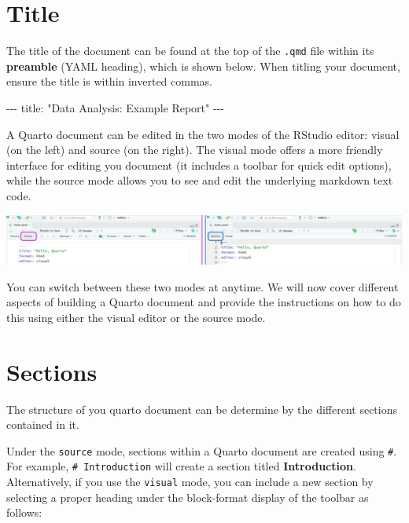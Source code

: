 \documentclass[
  letterpaper,
  DIV=11,
  numbers=noendperiod]{scrartcl}
\newenvironment{Shaded}{\begin{snugshade}}{\end{snugshade}}
\newcommand{\NormalTok}[1]{\textcolor[rgb]{0.00,0.23,0.31}{#1}}
\newcommand{\SpecialCharTok}[1]{\textcolor[rgb]{0.37,0.37,0.37}{#1}}
\newcommand{\StringTok}[1]{\textcolor[rgb]{0.13,0.47,0.30}{#1}}
\begin{document}
\section{Title}\label{sec-title}

The title of the document can be found at the top of the \texttt{.qmd}
file within its \textbf{preamble} (YAML heading), which is shown below.
When titling your document, ensure the title is within inverted commas.

\begin{Shaded}
\begin{Highlighting}[]
\SpecialCharTok{{-}{-}{-}}
\NormalTok{title}\SpecialCharTok{:} \StringTok{"Data Analysis: Example Report"}
\SpecialCharTok{{-}{-}{-}}
\end{Highlighting}
\end{Shaded}

A Quarto document can be edited in the two modes of the RStudio editor:
visual (on the left) and source (on the right). The visual mode offers a
more friendly interface for editing you document (it includes a toolbar
for quick edit options), while the source mode allows you to see and
edit the underlying markdown text code.

\begin{center}
\includegraphics[width=7.94792in,height=\textheight]{images/quarto2.png}
\end{center}

You can switch between these two modes at anytime. We will now cover
different aspects of building a Quarto document and provide the
instructions on how to do this using either the visual editor or the
source mode.

\section{Sections}\label{sec-sections}

The structure of you quarto document can be determine by the different
sections contained in it.

Under the \texttt{source} mode, sections within a Quarto document are
created using \texttt{\#}. For example, \texttt{\#\ Introduction} will
create a section titled \textbf{Introduction}. Alternatively, if you use
the \texttt{visual} mode, you can include a new section by selecting a
proper heading under the block-format display of the toolbar as follows:
\end{document}
